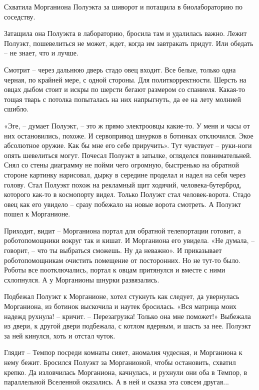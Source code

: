 \documentclass[ebook,oneside,final,openright]{memoir}
\begin{document}
Схватила Морганиона Полуэкта за шиворот и потащила в биолабораторию по соседству.\par
\par
Затащила она Полуэкта в лабораторию, бросила там и удалилась важно. Лежит Полуэкт, пошевелиться не может, ждет, когда им завтракать придут. Или обедать – не знает, что и лучше. \par
Смотрит – через дальнюю дверь стадо овец входит. Все белые, только одна черная, по крайней мере, с одной стороны. Для политкорректности. Шерсть на овцах дыбом стоит и искры по шерсти бегают размером со спаниеля. Какая-то тощая тварь с потолка попыталась на них напрыгнуть, да ее на лету молнией сшибло.\par
\par
«Эге, – думает Полуэкт, – это ж прямо электроовцы какие-то. У меня и часы от них остановились, похоже. И сервопривод шнурков в ботинках отключился. Экое абсолютное оружие. Как бы мне его себе приручить». Тут чувствует – руки-ноги опять шевелиться могут. Почесал Полуэкт в затылке, огляделся повнимательней. Снял со стены диаграмму не пойми чего огромную, быстренько на обратной стороне картинку нарисовал, дырку в середине проделал и надел на себя через голову. Стал Полуэкт похож на рекламный щит ходячий, человека-бутерброд, которого как-то в космопорту видел. Только Полуэкт стал человек-ворота. Стадо овец как его увидело – сразу побежало на новые ворота смотреть. А Полуэкт пошел к Морганионе.\par
\par
Приходит, видит – Морганиона портал для обратной телепортации готовит, а роботопомощники вокруг так и кишат. И Морганиона его увидела. «Не думала, – говорит, – что ты выбраться сможешь. Ну да неважно». И приказывает роботопомощникам очистить помещение от посторонних. Но не тут-то было. Роботы все поотключались, портал к овцам притянулся и вместе с ними схлопнулся. А у Морганионы шнурки развязались.\par
\par
Подбежал Полуэкт к Морганионе, хотел стукнуть как следует, да увернулась Морганиона, из ботинок выскочила и наутек бросилась. «Вся матрица моих надежд рухнула! – кричит. – Перезагрузка! Только она мне поможет!» Выбежала из двери, к другой двери подбежала, с котлом ядерным, и шасть за нее. Полуэкт за ней кинулся, хоть и отстал чуток.\par
\par
Глядит – Темпор посреди комнаты сияет, аномалия чудесная, и Морганиона к нему бежит. Бросился Полуэкт за Морганионой, чтобы остановить, схватил крепко. Да изловчилась Морганиона, качнулась, и рухнули они оба в Темпор, в параллельной Вселенной оказались. А в ней и сказка эта совсем другая...\par
\end{document}
